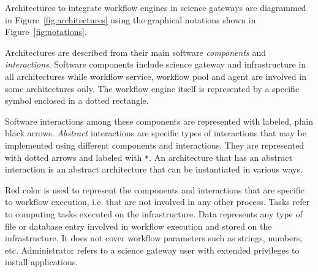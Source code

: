 \documentclass[preprint,3p,twocolumn]{elsarticle}
\newcommand{\note}[2]{\pdfmargincomment[color=yellow,author=#1,open=true]{#2}}
\newcommand{\closednote}[4]{} %
\begin{document}
Architectures to integrate workflow engines in science gateways are
diagrammed in Figure~\ref{fig:architectures} using the graphical
notations shown in Figure~\ref{fig:notations}.  \closednote{Marc-e}{A
  few things bother me a bit with the notation fig., making it harder
  to assimilate 1- The interactions are padded in the middle of other
  stuff (Administrator, Data) 2- The Software component example says
  "Science gateway", should it not be empty?  3- The red arrow to
  explain the use of red; it looks like a very specific type of
  interactions instead of the desired "any interactions or components
  can be red meaning...", especially with 'a' and 'd' which the reader
  does not know the meaning yet.  Maybe a little red arrow and square
  with "Red used when specific to workflow execution"?  I don't have a
  great solution...  Red has special meaning, maybe remove it from the
  other pics (workflow eng, tasks) as it creates lots of visual
  interference when looking for red?  4- Order in text jumps all over
  the fig notations. Explanations are given for, in order: Components,
  workflow engine, interactions, abstract interactions, red color,
  tasks, data (no Administrator?)...  Could re-ordering the fig fix
  this? A figure figure legend could go a long way too (are there some
  in this journal?)  }{Tristan}{Marc-E, is Figure 1 better now?}

Architectures are described from their main software \emph{components}
and \emph{interactions}. Software components include science gateway
and infrastructure in all architectures while workflow service,
workflow pool and agent are involved in some architectures only. The
workflow engine itself is represented by a specific symbol enclosed in a dotted rectangle.

Software interactions among these components are represented with
labeled, plain black arrows.  \emph{Abstract} interactions are
specific types of interactions that may be implemented using different
components and interactions. They are represented with dotted arrows
and labeled with \texttt{*}. An architecture that has an abstract
interaction is an abstract architecture that can be instantiated in
various ways.

Red color is used to represent the components and interactions that
are specific to workflow execution, i.e. that are not involved in any
other process. Tasks refer to computing tasks executed on the
infrastructure. Data represents any type of file or database entry involved
in workflow execution and stored on the infrastructure. It does not
cover workflow parameters such as strings, numbers, etc. Administrator
refers to a science gateway user with extended privileges to install
applications.
\end{document}
